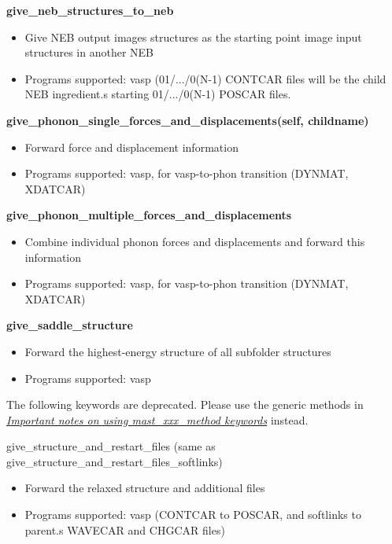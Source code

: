 \documentclass[letterpaper,10pt,english]{sphinxmanual}
\begin{document}
\textbf{give\_neb\_structures\_to\_neb}
\begin{itemize}
\item {} 
Give NEB output images structures as the starting point image input structures in another NEB

\item {} 
Programs supported: vasp (01/.../0(N-1) CONTCAR files will be the child NEB ingredient.s starting 01/.../0(N-1) POSCAR files.

\end{itemize}

\textbf{give\_phonon\_single\_forces\_and\_displacements(self, childname)}
\begin{itemize}
\item {} 
Forward force and displacement information

\item {} 
Programs supported: vasp, for vasp-to-phon transition (DYNMAT, XDATCAR)

\end{itemize}

\textbf{give\_phonon\_multiple\_forces\_and\_displacements}
\begin{itemize}
\item {} 
Combine individual phonon forces and displacements and forward this information

\item {} 
Programs supported: vasp, for vasp-to-phon transition (DYNMAT, XDATCAR)

\end{itemize}

\textbf{give\_saddle\_structure}
\begin{itemize}
\item {} 
Forward the highest-energy structure of all subfolder structures

\item {} 
Programs supported: vasp

\end{itemize}

The following keywords are deprecated. Please use the generic methods in {\hyperref[3_0_inputfile:important-notes]{\emph{Important notes on using mast\_xxx\_method keywords}}} instead.

give\_structure\_and\_restart\_files (same as give\_structure\_and\_restart\_files\_softlinks)
\begin{itemize}
\item {} 
Forward the relaxed structure and additional files

\item {} 
Programs supported: vasp (CONTCAR to POSCAR, and softlinks to parent.s WAVECAR and CHGCAR files)

\end{itemize}
\end{document}
